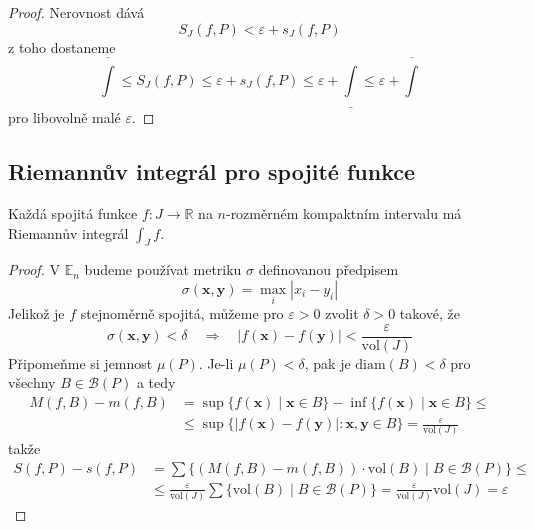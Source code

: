 \documentclass[../main.tex]{subfiles}
\begin{document}
\begin{proof}
	Nerovnost dává \[ S_J(f,P) < \varepsilon + s_J(f,P) \]
	z toho dostaneme
	\[ \overline{\int} \leq S_J(f,P) \leq \varepsilon + s_J(f,P) \leq \varepsilon + \underline{\int} \leq
	\varepsilon + \overline{\int}\]
	pro libovolně malé $\varepsilon$.
\end{proof}

\subsection{Riemannův integrál pro spojité funkce}
\begin{theorem}
	Každá spojitá funkce $f: J \to \mathbb{R}$ na $n$-rozměrném kompaktním intervalu má Riemannův integrál
	$\int_{J}f$.
\end{theorem}

\begin{proof}
	V $\mathbb{E}_n$ budeme používat metriku $\sigma$ definovanou předpisem
	\[ \sigma (\mathbf{x}, \mathbf{y}) = \max_{i} |x_i - y_i| \]
	Jelikož je $f$ stejnoměrně spojitá, můžeme pro $\varepsilon > 0$ zvolit $\delta > 0$ takové, že
	\[ \sigma (\mathbf{x}, \mathbf{y}) < \delta \quad \Rightarrow \quad
	|f(\mathbf{x}) - f(\mathbf{y})| < \frac{\varepsilon}{\textrm{vol}(J)} \]
	Připomeňme si jemnost $\mu (P)$. Je-li $\mu (P) < \delta$, pak je $\textrm{diam}(B) < \delta$ pro všechny
	$ B \in \mathcal{B}(P) $ a tedy
	\begin{align*}
			M(f, B) - m(f, B) &= \sup\{ f(\mathbf{x}) \mid \mathbf{x} \in B \} -
			\inf\{ f(\mathbf{x}) \mid \mathbf{x} \in B\}\leq\\
			&\leq \sup\{ |f(\mathbf{x}) - f(\mathbf{y})|: \mathbf{x}, \mathbf{y} \in B \}
			= \frac{\varepsilon}{\textrm{vol}(J)}
	\end{align*}
	takže
	\begin{align*}
			S(f,P) - s(f,P) &= \sum \{ (M(f,B) - m(f,B))\cdot \textrm{vol}(B) \mid B\in \mathcal{B}(P) \}\leq\\
			&\leq \frac{\varepsilon}{\textrm{vol}(J)}\sum \{ \textrm{vol}(B) \mid B\in \mathcal{B}(P) \}
			= \frac{\varepsilon}{\textrm{vol}(J)}\textrm{vol}(J) = \varepsilon
	\end{align*}
\end{proof}

\end{document}
